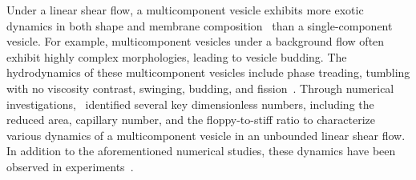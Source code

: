 \documentclass[twoside,twocolumn,9pt]{article}
\begin{document}
Under a linear shear flow, a multicomponent vesicle exhibits more exotic
dynamics in both shape and membrane
composition~\cite{soh-tse-li-voi-low2010, Smith2007_JChemPhys
Cox2015_Nonlinearity, liu-mar-li-vee-low2017, Tusch2018_PRF,
Gera2018_SoftMatter, ger-sal-spa2022} than a single-component vesicle.
For example, multicomponent vesicles under a background flow often
exhibit highly complex morphologies, leading to vesicle budding. The
hydrodynamics of these multicomponent vesicles include phase treading,
tumbling with no viscosity contrast, swinging, budding, and
fission~\cite{soh-tse-li-voi-low2010, wan-du2008, all-ama2006,
ger-sal-spa2022, lip1992, urs-klu-phi2009}. Through numerical
investigations,~\citet{liu-mar-li-vee-low2017} identified several key
dimensionless numbers, including the reduced area, capillary number, and
the floppy-to-stiff ratio to characterize various dynamics of a
multicomponent vesicle in an unbounded linear shear flow. In addition to
the aforementioned numerical studies, these dynamics have been observed
in experiments~\cite{bag-sun2009, yan-ima-tan2010, yan-ima-tan2008,
dre-jah-bob-spa-gop2021}.
\end{document}
